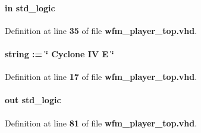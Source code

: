 \paragraph[{ddr2\+\_\+pll\+\_\+ref\+\_\+clk}]{ {\bfseries \textcolor{keywordflow}{in}\textcolor{vhdlchar}{ }} {\bfseries \textcolor{comment}{std\+\_\+logic}\textcolor{vhdlchar}{ }} \hspace{0.3cm}{\ttfamily [Port]}}\label{classwfm__player__top_a66f4da22e2b2937d6894754654cc1324}


Definition at line {\bf 35} of file {\bf wfm\+\_\+player\+\_\+top.\+vhd}.

\paragraph[{dev\+\_\+family}]{ {\bfseries \textcolor{vhdlchar}{ }} {\bfseries \textcolor{comment}{string}\textcolor{vhdlchar}{ }\textcolor{vhdlchar}{ }\textcolor{vhdlchar}{\+:}\textcolor{vhdlchar}{=}\textcolor{vhdlchar}{ }\textcolor{vhdlchar}{ }\textcolor{vhdlchar}{ }\textcolor{vhdlchar}{ }\textcolor{keyword}{\char`\"{} Cyclone I\+V E \char`\"{}}\textcolor{vhdlchar}{ }} \hspace{0.3cm}{\ttfamily [Generic]}}\label{classwfm__player__top_a1314572919959082d23e5f98e64a0ce2}


Definition at line {\bf 17} of file {\bf wfm\+\_\+player\+\_\+top.\+vhd}.

\paragraph[{fail}]{ {\bfseries \textcolor{keywordflow}{out}\textcolor{vhdlchar}{ }} {\bfseries \textcolor{comment}{std\+\_\+logic}\textcolor{vhdlchar}{ }} \hspace{0.3cm}{\ttfamily [Port]}}\label{classwfm__player__top_ac8c760cbbf60d6542fd4e3847b4e6bed}


Definition at line {\bf 81} of file {\bf wfm\+\_\+player\+\_\+top.\+vhd}.

